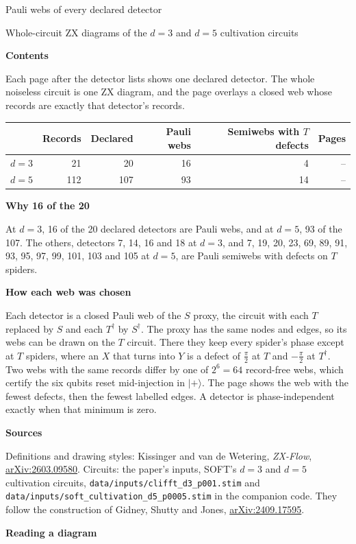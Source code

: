 \documentclass[11pt]{article}
\begin{document}
\begin{semiwebaddition}
{\LARGE Pauli webs of every declared detector}\par
\medskip
{\large Whole-circuit ZX diagrams of the $d=3$ and $d=5$ cultivation circuits}
\bigskip

\begin{minipage}[t]{.47\linewidth}
\textbf{Contents}

Each page after the detector lists shows one declared detector. The whole
noiseless circuit is one ZX diagram, and the page overlays a closed web whose
records are exactly that detector's records.

\medskip
\begin{tabular}{lrrrrr}
\toprule
 & Records & Declared & Pauli webs & Semiwebs with $T$ defects & Pages\\
\midrule
$d=3$ & 21 & 20 & 16 & 4 & \pageref*{d3_det000}--\pageref*{d3_det019}\\
$d=5$ & 112 & 107 & 93 & 14 & \pageref*{d5_det000}--\pageref*{d5_det106}\\
\bottomrule
\end{tabular}

\medskip
\textbf{Why 16 of the 20}

At $d=3$, 16 of the 20 declared detectors are Pauli webs, and at $d=5$, 93 of the 107.
The others, detectors 7, 14, 16 and 18 at $d=3$, and 7, 19, 20, 23, 69, 89, 91, 93, 95, 97, 99, 101, 103 and 105 at $d=5$, are Pauli semiwebs with defects on $T$ spiders.

\medskip
\textbf{How each web was chosen}

Each detector is a closed Pauli web of the $S$ proxy, the circuit with each
$T$ replaced by $S$ and each $T^\dagger$ by $S^\dagger$. The proxy has the
same nodes and edges, so its webs can be drawn on the $T$ circuit. There they
keep every spider's phase except at $T$ spiders, where an $X$ that turns into
$Y$ is a defect of $\frac{\pi}{2}$ at $T$ and $-\frac{\pi}{2}$ at $T^\dagger$.
Two webs with the same records differ by one of $2^6=64$ record-free webs,
which certify the six qubits reset mid-injection in $|+\rangle$. The page shows
the web with the fewest defects, then the fewest labelled edges. A detector is
phase-independent exactly when that minimum is zero.

\medskip
\textbf{Sources}

Definitions and drawing styles: Kissinger and van de Wetering,
\emph{ZX-Flow}, \href{https://arxiv.org/abs/2603.09580}{arXiv:2603.09580}.
Circuits: the paper's inputs, SOFT's $d=3$ and $d=5$ cultivation circuits,
\texttt{data/inputs/clifft\_d3\_p001.stim} and \texttt{data/inputs/soft\_cultivation\_d5\_p0005.stim} in the companion code. They follow the construction of Gidney, Shutty and Jones,
\href{https://arxiv.org/abs/2409.17595}{arXiv:2409.17595}.
\end{minipage}\hfill
\begin{minipage}[t]{.49\linewidth}
\textbf{Reading a diagram}


\end{minipage}
\end{semiwebaddition}
\end{document}
